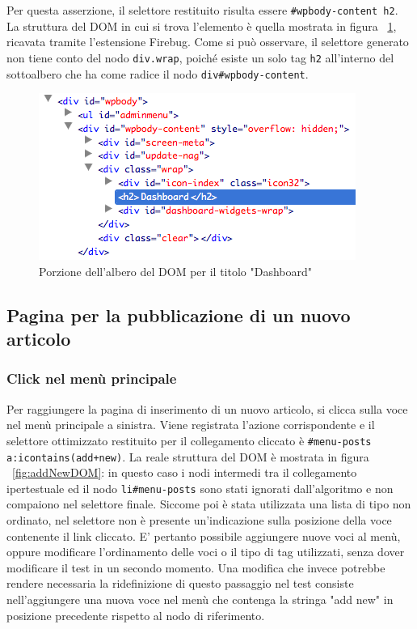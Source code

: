 \documentclass[12pt]{toptesi}
\begin{document}
Per questa asserzione, il selettore restituito risulta essere \verb|#wpbody-content h2|. La struttura del DOM in cui si trova l'elemento è quella mostrata in figura ~\ref{fig:dashboardH2DOM}, ricavata tramite l'estensione Firebug. Come si può osservare, il selettore generato non tiene conto del nodo \verb|div.wrap|, poiché esiste un solo tag \verb|h2| all'interno del sottoalbero che ha come radice il nodo \verb|div#wpbody-content|. 

\begin{figure}[htbp]
\begin{center}
\includegraphics[width=\textwidth]{images/wp_tour/7_dashboard_h2_firebug.png}
\caption{Porzione dell'albero del DOM per il titolo "Dashboard"}
\label{fig:dashboardH2DOM}
\end{center}
\end{figure}

\subsection{Pagina per la pubblicazione di un nuovo articolo}

\subsubsection{Click nel menù principale}

Per raggiungere la pagina di inserimento di un nuovo articolo, si clicca sulla voce nel menù principale a sinistra. Viene registrata l'azione corrispondente e il selettore ottimizzato restituito per il collegamento cliccato è \verb|#menu-posts a:icontains(add+new)|. La reale struttura del DOM è mostrata in figura ~\ref{fig:addNewDOM}: in questo caso i nodi intermedi tra il collegamento ipertestuale ed il nodo \verb|li#menu-posts| sono stati ignorati dall'algoritmo e non compaiono nel selettore finale. Siccome poi è stata utilizzata una lista di tipo non ordinato, nel selettore non è presente un'indicazione sulla posizione della voce contenente il link cliccato. E' pertanto possibile aggiungere nuove voci al menù, oppure modificare l'ordinamento delle voci o il tipo di tag utilizzati, senza dover modificare il test in un secondo momento. Una modifica che invece potrebbe rendere necessaria la ridefinizione di questo passaggio nel test consiste nell'aggiungere una nuova voce nel menù che contenga la stringa "add new" in posizione precedente rispetto al nodo di riferimento.
\end{document}
